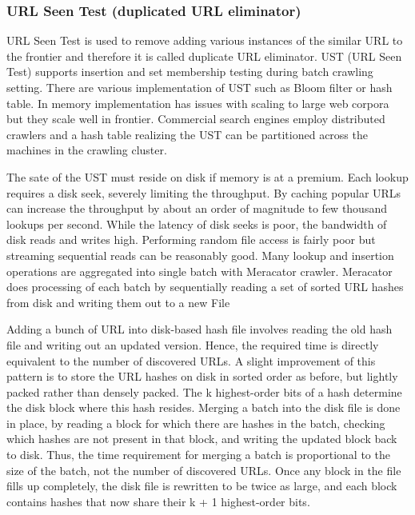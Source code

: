 \documentclass[article,type=msc,colorback,accentcolor=tud9c,twoside,11pt]{tudthesis}
\begin{document}
\subsubsection{URL Seen Test (duplicated URL eliminator)}
URL Seen Test is used to remove adding various instances of the similar URL to the frontier and therefore it is called duplicate URL eliminator. UST (URL Seen Test) supports insertion and set membership testing during batch crawling setting. There are various implementation of UST such as Bloom filter or hash table. In memory implementation has issues with scaling to large web corpora but they scale well in frontier. Commercial search engines employ distributed crawlers and a hash table realizing the UST can be partitioned across the machines in the crawling cluster.

The sate of the UST must reside on disk if memory is at a premium. Each lookup requires a disk seek, severely limiting the throughput. By caching popular URLs can increase the throughput by about an order of magnitude\cite{Graphstructure} to few thousand lookups per second. While the latency of disk seeks is poor, the bandwidth of disk reads and writes high. Performing random file access is fairly poor but streaming sequential reads can be reasonably good. Many lookup and insertion operations are aggregated into single batch with Meracator crawler. Meracator does processing of each batch by sequentially reading a set of sorted URL hashes from disk and writing them out to a new File\cite{Highperformancewebcrawling}

Adding a bunch of URL into disk-based hash file involves reading the old hash file and writing out an updated version. Hence, the required time is directly equivalent to the number of discovered URLs. A slight improvement of this pattern is to store the URL hashes on disk in sorted order as before, but lightly packed rather than densely packed. The k highest-order bits of a hash determine the disk block where this hash resides. Merging a batch into the disk file is done in place, by reading a block for which there are hashes in the batch, checking which hashes are not present in that block, and writing the updated block back to disk. Thus, the time requirement for merging a batch is proportional to the size of the batch, not the number of discovered URLs. Once any block in the file fills up completely, the disk file is rewritten to be twice as large, and each block contains hashes that now share their k + 1 highest-order bits.
\end{document}
